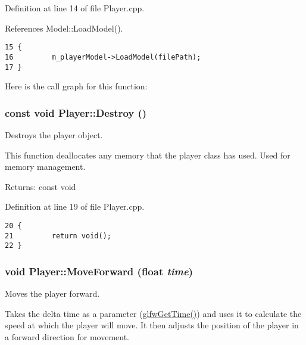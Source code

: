 Definition at line 14 of file Player.cpp.

References Model::LoadModel().

\begin{Code}\begin{verbatim}15 {
16         m_playerModel->LoadModel(filePath);
17 }
\end{verbatim}
\end{Code}




Here is the call graph for this function:\hypertarget{class_player_e275691f90f93b0cf6134b2626da5e39}{
\subsubsection[Destroy]{\setlength{\rightskip}{0pt plus 5cm}const void Player::Destroy ()}}
\label{class_player_e275691f90f93b0cf6134b2626da5e39}


Destroys the player object. 

This function deallocates any memory that the player class has used. Used for memory management.

\begin{Desc}
\item[Returns:]const void \end{Desc}


Definition at line 19 of file Player.cpp.

\begin{Code}\begin{verbatim}20 {
21         return void();
22 }
\end{verbatim}
\end{Code}


\hypertarget{class_player_afa223a6906cf925ac0f9ae1ad197cde}{
\subsubsection[MoveForward]{\setlength{\rightskip}{0pt plus 5cm}void Player::MoveForward (float {\em time})}}
\label{class_player_afa223a6906cf925ac0f9ae1ad197cde}


Moves the player forward. 

Takes the delta time as a parameter (\hyperlink{group__input_g03d4a1039b8662c71eeb40beea8cb622}{glfwGetTime()}) and uses it to calculate the speed at which the player will move. It then adjusts the position of the player in a forward direction for movement.

